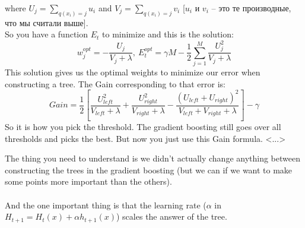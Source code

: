 \begin{enumerate}
  where $U_j=\sum\limits_{q(x_i)=j}u_i$ and $V_j=\sum\limits_{q(x_i)=j}v_i$ [$u_i$ и $v_i$ -- это те производные, что мы считали выше].\\
  So you have a function $E_t$ to minimize and this is the solution:
  $$w_j^{opt}=-\frac{U_j}{V_j+\lambda},\ E_t^{opt}=\gamma M-\frac{1}{2}\sum\limits_{j=1}^M\frac{U_j^2}{V_j+\lambda}$$
  This solution gives us the optimal weights to minimize our error when constructing a tree. The Gain corresponding to that error is:
  $$Gain = \frac{1}{2}\left[\frac{U_{left}^2}{V_{left}+\lambda}+\frac{U_{right}^2}{V_{right}+\lambda}-\frac{(U_{left}+U_{right})^2}{V_{left}+V_{right}+\lambda}\right]-\gamma$$
  So it is how you pick the threshold. The gradient boosting still goes over all thresholds and picks the best. But now you just use this Gain formula. <...>
\end{enumerate}
The thing you need to understand is we didn't actually change anything between constructing the trees in the gradient boosting (but we can if we want to make some points more important than the others).\\
{\it <Smth about CatBoost>}\\
And the one important thing is that the learning rate ($\alpha$ in $H_{t+1}=H_t(x)+\alpha h_{t+1}(x)$) scales the answer of the tree.
